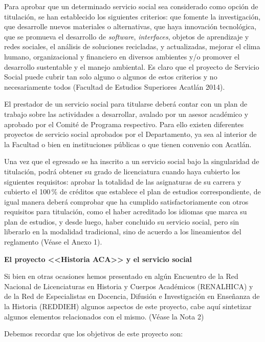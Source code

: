 Para aprobar que un determinado servicio social sea considerado como opción
de titulación, se han establecido los siguientes criterios: que  fomente la
investigación, que desarrolle nuevos materiales o alternativas, que haya
innovación tecnológica, que se promueva el desarrollo de \textit{software},
\textit{interfaces}, objetos de aprendizaje y redes sociales, el análisis
de soluciones recicladas,  y actualizadas, mejorar el clima humano,
organizacional y financiero en diversos ambientes y/o promover el
desarrollo sustentable y el manejo ambiental. Es claro que el proyecto de
Servicio Social puede cubrir tan solo alguno o algunos de estos criterios y
no necesariamente todos (Facultad de Estudios Superiores Acatlán 2014).

El prestador de un servicio social para titularse deberá contar con un plan
de trabajo sobre las actividades a desarrollar, avalado por un asesor
académico y aprobado por el Comité de Programa respectivo. Para ello
existen diferentes proyectos de servicio social aprobados por el
Departamento, ya sea al interior de la Facultad o bien en instituciones
públicas o que tienen convenio con Acatlán.

Una vez que el egresado se ha inscrito a un servicio social bajo la
singularidad de titulación, podrá obtener su grado de licenciatura cuando
haya cubierto los siguientes requisitos: aprobar la totalidad de las
asignaturas de su carrera y cubierto el 100\,\% de créditos que establece el
plan de estudios correspondiente, de igual manera deberá comprobar que ha
cumplido satisfactoriamente con otros requisitos para titulación, como el
haber acreditado los idiomas que marca su plan de estudios, y desde luego,
haber concluido su servicio social,  pero sin liberarlo en la modalidad
tradicional, sino de acuerdo a los lineamientos del reglamento (Véase el Anexo
1). 

\medskip 
\textbf{El proyecto <<Historia ACA>> y el servicio social}

Si bien en otras ocasiones hemos presentado en algún Encuentro de la Red
Nacional de Licenciaturas en Historia y Cuerpos Académicos (RENALHICA) y de
la Red de Especialistas en Docencia, Difusión e Investigación en Enseñanza
de la Historia (REDDIEH) algunos aspectos de este proyecto, cabe aquí
sintetizar algunos elementos relacionados con el mismo. (Véase la Nota 2) 
\newpage

Debemos recordar que los objetivos de este proyecto son: 

